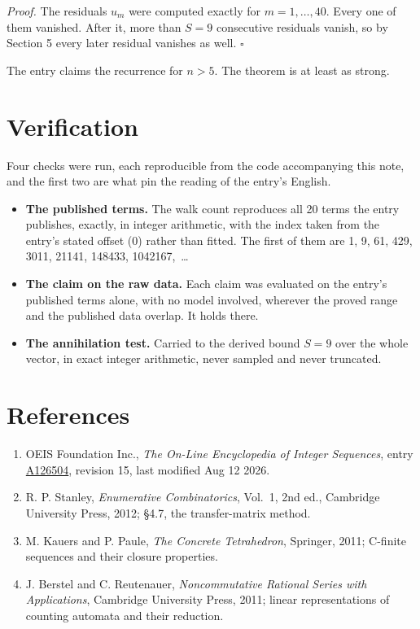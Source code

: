\documentclass[11pt]{article}
\theoremstyle{definition}
\begin{document}
{\itshape Proof.} The residuals $u_m$ were computed exactly for $m = 1,\dots,40$. Every one of them vanished. After it, more than $S = 9$ consecutive residuals vanish, so by Section 5 every later residual vanishes as well. $\square$

The entry claims the recurrence for $n > 5$. The theorem is at least as strong.

\section{Verification}

Four checks were run, each reproducible from the code accompanying this note, and the first two are what pin the reading of the entry's English.

\begin{itemize}

\item {\bfseries The published terms.} The walk count reproduces all 20 terms the entry publishes, exactly, in integer arithmetic, with the index taken from the entry's stated offset (0) rather than fitted. The first of them are 1, 9, 61, 429, 3011, 21141, 148433, 1042167,~\dots

\item {\bfseries The claim on the raw data.} Each claim was evaluated on the entry's published terms alone, with no model involved, wherever the proved range and the published data overlap. It holds there.

\item {\bfseries The annihilation test.} Carried to the derived bound $S = 9$ over the whole vector, in exact integer arithmetic, never sampled and never truncated.

\end{itemize}

\section{References}

\begin{enumerate}

\item OEIS Foundation Inc., \emph{The On-Line Encyclopedia of Integer Sequences}, entry \href{https://oeis.org/A126504}{A126504}, revision 15, last modified Aug 12 2026.

\item R. P. Stanley, \emph{Enumerative Combinatorics}, Vol.~1, 2nd ed., Cambridge University Press, 2012; \S4.7, the transfer-matrix method.

\item M. Kauers and P. Paule, \emph{The Concrete Tetrahedron}, Springer, 2011; C-finite sequences and their closure properties.

\item J. Berstel and C. Reutenauer, \emph{Noncommutative Rational Series with Applications}, Cambridge University Press, 2011; linear representations of counting automata and their reduction.

\end{enumerate}
\end{document}
